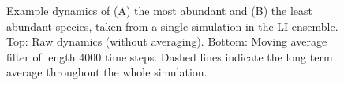 \begin{figure}[hp]
	\centering
	\renewcommand{\thesubfigure}{}%
		
    \caption{Example dynamics of (A) the most abundant and (B) the least abundant species, taken from a single simulation in the LI ensemble. Top: Raw dynamics (without averaging). Bottom: Moving average filter of length 4000 time steps. Dashed lines indicate the long term average throughout the whole simulation.}    
    \label{fig:maf_example}
\end{figure}


